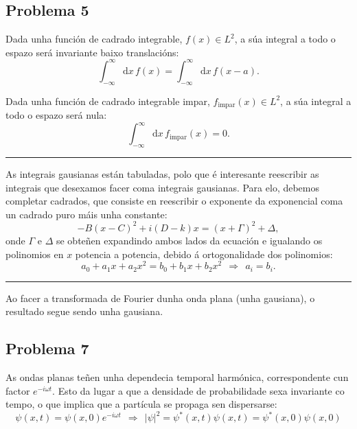\documentclass[a4paper,12pt]{article}
\begin{document}
\subsection*{Problema 5}

Dada unha función de cadrado integrable, $f(x) \in L^2$, a súa integral a todo o espazo será invariante baixo translacións:
\begin{equation}
	\int_{-\infty}^{\infty} \mathrm{d}x \, f(x) = \int_{-\infty}^{\infty} \mathrm{d}x \, f(x-a).
\end{equation}

Dada unha función de cadrado integrable impar, $f_\mathrm{impar}(x) \in L^2$, a súa integral a todo o espazo será nula:
\begin{equation}
	\int_{-\infty}^{\infty} \mathrm{d}x \, f_\mathrm{impar}(x) = 0.
\end{equation}

\begin{center} \hrule \end{center}

As integrais gausianas están tabuladas, polo que é interesante reescribir as integrais que desexamos facer coma integrais gausianas. Para elo, debemos completar cadrados, que consiste en reescribir o exponente da exponencial coma un cadrado puro máis unha constante:
\begin{equation}
	-B(x-C)^2 + i(D-k)x = (x+ \Gamma)^2 + \Delta,
\end{equation} 
\noindent
onde $\Gamma$ e $\Delta$ se obteñen expandindo ambos lados da ecuación e igualando os polinomios en $x$ potencia a potencia, debido á ortogonalidade dos polinomios:
\begin{equation}
	a_0 + a_1 x + a_2 x^2 = b_0 + b_1 x + b_2 x^2 ~~\Longrightarrow~~ a_i = b_i.
\end{equation}

\begin{center} \hrule \end{center}

Ao facer a transformada de Fourier dunha onda plana (unha gausiana), o resultado segue sendo unha gausiana.

\subsection*{Problema 7}

As ondas planas teñen unha dependecia temporal harmónica, correspondente cun factor $e^{-i\omega t}$. Esto da lugar a que a densidade de probabilidade sexa invariante co tempo, o que implica que a partícula se propaga sen dispersarse:
\begin{equation}
	\psi(x,t) = \psi(x,0) e^{-i\omega t} ~~\Longrightarrow~~ |\psi|^2 = \psi^*(x,t) \psi(x,t) = \psi^*(x,0) \psi(x,0)
\end{equation}
\end{document}
